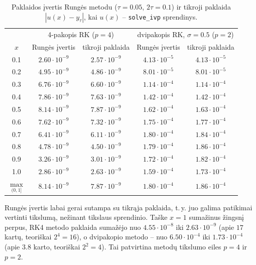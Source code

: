 \documentclass[12pt,a4paper]{article}
\begin{document}
\begin{table}[H]
\centering\small
\caption{Paklaidos įvertis Rungės metodu ($\tau=0.05$, $2\tau=0.1$) ir tikroji paklaida
$|u(x)-y_\tau|$, kai $u(x)$ -- \texttt{solve\_ivp} sprendinys.}
\begin{tabular}{c|cc|cc}
\toprule
 & \multicolumn{2}{c|}{4-pakopis RK ($p=4$)} & \multicolumn{2}{c}{dvipakopis RK, $\sigma=0.5$ ($p=2$)}\\
$x$ & Rungės įvertis & tikroji paklaida & Rungės įvertis & tikroji paklaida\\
\midrule
0.1 & $2.60\cdot10^{-9}$ & $2.57\cdot10^{-9}$ & $4.13\cdot10^{-5}$ & $4.13\cdot10^{-5}$\\
0.2 & $4.95\cdot10^{-9}$ & $4.86\cdot10^{-9}$ & $8.01\cdot10^{-5}$ & $8.01\cdot10^{-5}$\\
0.3 & $6.76\cdot10^{-9}$ & $6.60\cdot10^{-9}$ & $1.14\cdot10^{-4}$ & $1.14\cdot10^{-4}$\\
0.4 & $7.86\cdot10^{-9}$ & $7.63\cdot10^{-9}$ & $1.42\cdot10^{-4}$ & $1.42\cdot10^{-4}$\\
0.5 & $8.14\cdot10^{-9}$ & $7.87\cdot10^{-9}$ & $1.62\cdot10^{-4}$ & $1.63\cdot10^{-4}$\\
0.6 & $7.62\cdot10^{-9}$ & $7.32\cdot10^{-9}$ & $1.75\cdot10^{-4}$ & $1.77\cdot10^{-4}$\\
0.7 & $6.41\cdot10^{-9}$ & $6.11\cdot10^{-9}$ & $1.80\cdot10^{-4}$ & $1.84\cdot10^{-4}$\\
0.8 & $4.78\cdot10^{-9}$ & $4.50\cdot10^{-9}$ & $1.79\cdot10^{-4}$ & $1.86\cdot10^{-4}$\\
0.9 & $3.26\cdot10^{-9}$ & $3.01\cdot10^{-9}$ & $1.72\cdot10^{-4}$ & $1.82\cdot10^{-4}$\\
1.0 & $2.86\cdot10^{-9}$ & $2.63\cdot10^{-9}$ & $1.59\cdot10^{-4}$ & $1.73\cdot10^{-4}$\\
\midrule
$\max\limits_{(0,1]}$ & $8.14\cdot10^{-9}$ & $7.87\cdot10^{-9}$ & $1.80\cdot10^{-4}$ & $1.86\cdot10^{-4}$\\
\bottomrule
\end{tabular}
\end{table}

Rungės įvertis labai gerai sutampa su tikrąja paklaida, t.\,y. juo galima patikimai vertinti
tikslumą, nežinant tikslaus sprendinio. Taške $x=1$ sumažinus žingsnį perpus, RK4 metodo paklaida
sumažėjo nuo $4.55\cdot10^{-8}$ iki $2.63\cdot10^{-9}$ (apie $17$ kartų, teoriškai $2^4=16$), o
dvipakopio metodo -- nuo $6.50\cdot10^{-4}$ iki $1.73\cdot10^{-4}$ (apie $3.8$ karto, teoriškai
$2^2=4$). Tai patvirtina metodų tikslumo eiles $p=4$ ir $p=2$.
\end{document}
